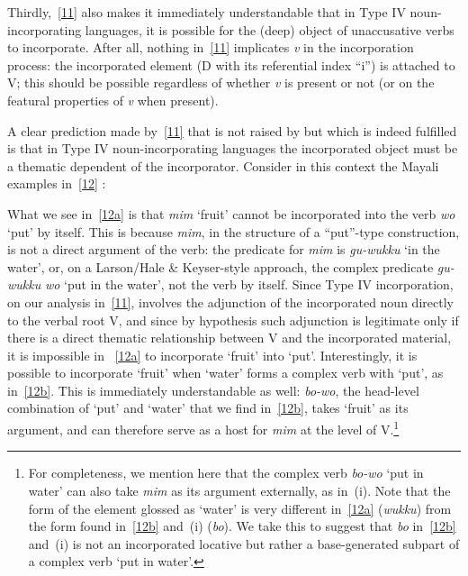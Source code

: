 \documentclass[output=paper]{langsci/langscibook}
\begin{document}
\begin{refcontext}
Thirdly,~\eqref{11} also makes it immediately understandable that in Type IV
noun-incorporating languages, it is possible for the (deep) object of
unaccusative verbs to incorporate. After all, nothing in~\eqref{11} implicates
\emph{v} in the incorporation process: the incorporated element (D with its
referential index \enquote{i}) is attached to V; this should be possible regardless
of whether \emph{v} is present or not (or on the featural properties of
\emph{v} when present).

A clear prediction made by~\eqref{11} that is not raised by \cite{bakeretal05}
but which is indeed fulfilled is that in Type IV noun-incorporating languages
the incorporated object must be a thematic dependent of the incorporator.
Consider in this context the Mayali examples in~\eqref{12} \citep{evans94}:

\ea \label{12}
    \z
\z
What we see in~\eqref{12a} is that \emph{mim} \enquote*{fruit} cannot be incorporated into the
verb \emph{wo} \enquote*{put} by itself. This is because \emph{mim}, in the structure
of a \enquote{put}-type construction, is not a direct argument of the verb: the
predicate for \emph{mim} is \emph{gu-wukku} \enquote*{in the water}, or, on a
Larson/Hale \&{} Keyser-style approach, the complex predicate \emph{gu-wukku}
\emph{wo} \enquote*{put in the water}, not the verb by itself. Since Type IV
incorporation, on our analysis in~\eqref{11}, involves the adjunction of the
incorporated noun directly to the verbal root V, and since by hypothesis such
adjunction is legitimate only if there is a direct thematic relationship
between V and the incorporated material, it is impossible in ~\eqref{12a}
to incorporate \enquote*{fruit} into \enquote*{put}. Interestingly, it is possible to
incorporate \enquote*{fruit} when \enquote*{water} forms a complex verb with \enquote*{put}, as
in~\eqref{12b}. This is immediately understandable as well: \emph{bo-wo}, the
head-level combination of \enquote*{put} and \enquote*{water} that we find
in~\eqref{12b}, takes \enquote*{fruit} as its argument, and can therefore serve
as a host for \emph{mim} at the level of V.\footnote{For completeness, we
    mention here that the complex verb \emph{bo-wo} \enquote*{put in water} can
    also take \emph{mim} as its argument externally, as in~(i). Note that the
    form of the element glossed as \enquote*{water} is very different
    in~\eqref{12a} (\emph{wukku}) from the form found in~\eqref{12b} and~(i)
    (\emph{bo}). We take this to suggest that \emph{bo} in~\eqref{12b} and~(i)
    is not an incorporated locative but rather a base-generated subpart of a
    complex verb \enquote*{put in water}.

}
\end{refcontext}
\end{document}
